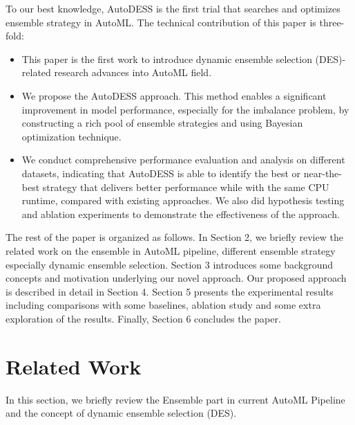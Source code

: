 \documentclass[review]{elsarticle}
\begin{document}
To our best knowledge, AutoDESS is the first trial that searches and optimizes ensemble strategy in AutoML. The technical contribution of this paper is three-fold:
\begin{itemize}
\item This paper is the first work to introduce dynamic ensemble selection (DES)-related research advances into AutoML field.
\item We propose the AutoDESS approach. This method enables a significant improvement in model performance, especially for the imbalance problem, by constructing a rich pool of ensemble strategies and using Bayesian optimization technique.
\item We conduct comprehensive performance evaluation and analysis on different datasets, indicating that AutoDESS is able to identify the best or near-the-best strategy that delivers better performance while with the same CPU runtime, compared with existing approaches. We also did hypothesis testing and ablation experiments to demonstrate the effectiveness of the approach.
\end{itemize}

The rest of the paper is organized as follows. In Section 2, we briefly review the related work on the ensemble in AutoML pipeline, different ensemble strategy especially dynamic ensemble selection. Section 3 introduces some background concepts and motivation underlying our novel approach. Our proposed approach is described in detail in Section 4. Section 5 presents the experimental results including comparisons with some baselines, ablation study and some extra exploration of the results. Finally, Section 6 concludes the paper.


\section{Related Work}
In this section, we briefly review the Ensemble part in current AutoML Pipeline and the concept of dynamic ensemble selection (DES).
\end{document}
